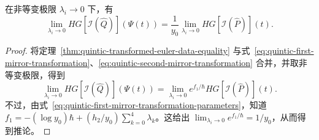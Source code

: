 \begin{corollary}\label{cor:quintic-hypergeometric-mirror-equality}
在非等变极限 $\lambda_i\to0$ 下，有
\[
\lim_{\lambda_i\to0}HG[\mathcal I(\widehat Q)](\Psi(t))
=\frac1{y_0}\lim_{\lambda_i\to0}HG[\mathcal I(\widehat P)](t).
\]
\end{corollary}
\begin{proof}
将定理~\ref{thm:quintic-transformed-euler-data-equality} 与式~\eqref{eq:quintic-first-mirror-transformation}、\eqref{eq:quintic-second-mirror-transformation} 合并，并取非等变极限，得到
\[
\lim_{\lambda_i\to0}HG[\mathcal I(\widehat Q)](\Psi(t))
=\lim_{\lambda_i\to0}e^{f_1/\hbar}HG[\mathcal I(\widehat P)](t).
\]
不过，由式~\eqref{eq:quintic-first-mirror-transformation-parameters}，知道
$f_1=-(\log y_0)\hbar+(h_2/y_0)\sum_{k=0}^4\lambda_k$。这给出 $\lim_{\lambda_i\to0}e^{f_1/\hbar}=1/y_0$，从而得到推论。
\end{proof}

